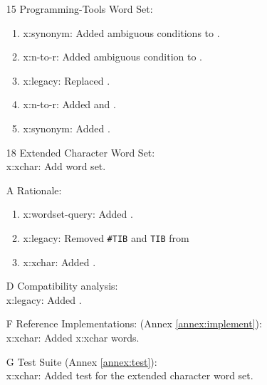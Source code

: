 \begin{itemize}
	\item[15] Programming-Tools Word Set:
		\begin{enumerate}
		\item \textsf{x:synonym}: Added ambiguous conditions to .
		\item \textsf{x:n-to-r}: Added ambiguous condition to .
		\item \textsf{x:legacy}: Replaced .
		\item \textsf{x:n-to-r}: Added  and .
		\item \textsf{x:synonym}: Added .
		\end{enumerate}

	\item[18] Extended Character Word Set: \\
		\textsf{x:xchar}: Add word set.

	\item[A] Rationale:								%
		\begin{enumerate}
		\item \textsf{x:wordset-query}: Added .
		\item \textsf{x:legacy}: Removed \texttt{\#TIB} and \texttt{TIB} from
		\item \textsf{x:xchar}: Added .
		\end{enumerate}

	\item[D] Compatibility analysis: \\			%
		\textsf{x:legacy}: Added .

	\item[F] Reference Implementations: (Annex \ref{annex:implement}): \\
		\textsf{x:xchar}: Added \textsf{x:xchar} words.

	\item[G] Test Suite (Annex \ref{annex:test}): \\
		\textsf{x:xchar}: Added test for the extended character word set.
	\end{itemize}

\endinput

